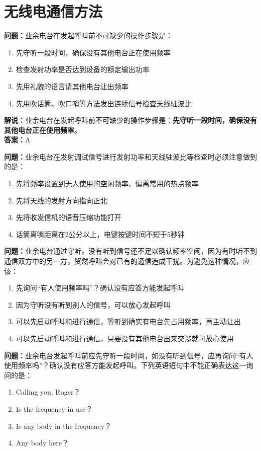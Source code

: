\chapter{无线电通信方法}



\textbf{问题：}业余电台在发起呼叫前不可缺少的操作步骤是：
\begin{enumerate}[label=\Alph*), leftmargin=1cm]
	\item 先守听一段时间，确保没有其他电台正在使用频率
	\item 检查发射功率是否达到设备的额定输出功率
	\item 先用礼貌的语言请其他电台让出频率
	\item 先用吹话筒、吹口哨等方法发出连续信号检查天线驻波比
\end{enumerate}
\textbf{解说：}业余电台在发起呼叫前不可缺少的操作步骤是：\textbf{先守听一段时间，确保没有其他电台正在使用频率}。\\\textbf{答案：}A%


\textbf{问题：}业余电台在发射调试信号进行发射功率和天线驻波比等检查时必须注意做到的是：
\begin{enumerate}[label=\Alph*), leftmargin=1cm]
	\item 先将频率设置到无人使用的空闲频率、偏离常用的热点频率
	\item 先将天线的发射方向指向正北
	\item 先将收发信机的语音压缩功能打开
	\item 话筒离嘴距离在2公分以上，电键按键时间不短于5秒钟
\end{enumerate}

\textbf{问题：}业余电台通过守听，没有听到信号还不足以确认频率空闲，因为有时听不到通信双方中的另一方，贸然呼叫会对已有的通信造成干扰。为避免这种情况，应该：
\begin{enumerate}[label=\Alph*), leftmargin=1cm]
	\item 先询问“有人使用频率吗”？确认没有应答方能发起呼叫
	\item 因为守听没有听到别人的信号，可以放心发起呼叫
	\item 可以先启动呼叫和进行通信，等听到确实有电台先占用频率，再主动让出
	\item 可以先启动呼叫和进行通信，只要没有其他电台出来交涉就可放心使用
\end{enumerate}

\textbf{问题：}业余电台发起呼叫前应先守听一段时间，如没有听到信号，应再询问“有人使用频率吗”？确认没有应答方能发起呼叫。下列英语短句中不能正确表达这一询问的是：
\begin{enumerate}[label=\Alph*), leftmargin=1cm]
	\item Calling you, Roger？
	\item Is the frequency in use？
	\item Is any body in the frequency？
	\item Any body here？
\end{enumerate}

